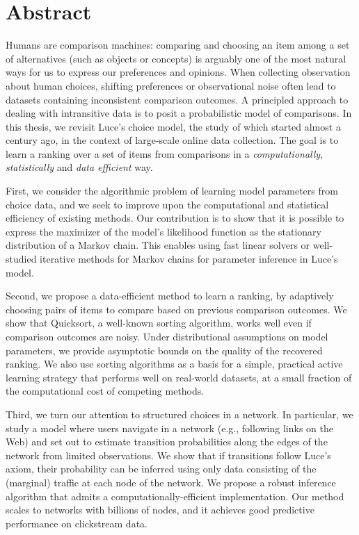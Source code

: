 \cleardoublepage
\chapter*{Abstract}

Humans are comparison machines: comparing and choosing an item among a set of alternatives (such as objects or concepts) is arguably one of the most natural ways for us to express our preferences and opinions.
When collecting observation about human choices, shifting preferences or observational noise often lead to datasets containing inconsistent comparison outcomes.
A principled approach to dealing with intransitive data is to posit a probabilistic model of comparisons.
In this thesis, we revisit Luce's choice model, the study of which started almost a century ago, in the context of large-scale online data collection.
The goal is to learn a ranking over a set of items from comparisons in a \emph{computationally}, \emph{statistically} and \emph{data efficient} way.

First, we consider the algorithmic problem of learning model parameters from choice data, and we seek to improve upon the computational and statistical efficiency of existing methods.
Our contribution is to show that it is possible to express the maximizer of the model's likelihood function as the stationary distribution of a Markov chain.
This enables using fast linear solvers or well-studied iterative methods for Markov chains for parameter inference in Luce's model.

Second, we propose a data-efficient method to learn a ranking, by adaptively choosing pairs of items to compare based on previous comparison outcomes.
We show that Quicksort, a well-known sorting algorithm, works well even if comparison outcomes are noisy. Under distributional assumptions on model parameters, we provide asymptotic bounds on the quality of the recovered ranking.
We also use sorting algorithms as a basis for a simple, practical active learning strategy that performs well on real-world datasets, at a small fraction of the computational cost of competing methods.

Third, we turn our attention to structured choices in a network.
In particular, we study a model where users navigate in a network (e.g., following links on the Web) and set out to estimate transition probabilities along the edges of the network from limited observations.
We show that if transitions follow Luce's axiom, their probability can be inferred using only data consisting of the (marginal) traffic at each node of the network.
We propose a robust inference algorithm that admits a computationally-efficient implementation.
Our method scales to networks with billions of nodes, and it achieves good predictive performance on clickstream data.

